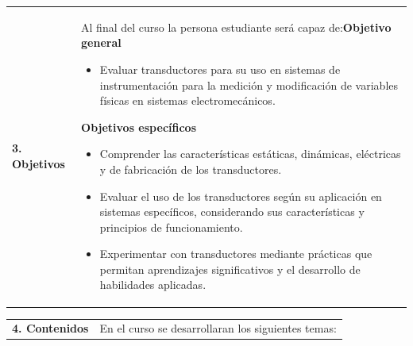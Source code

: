 \documentclass[letterpaper]{article}%
\begin{document}
\begin{tabularx}{\textwidth}{p{3cm}p{13cm}}%
\par\fontsize{12}{14}\selectfont \textbf{\textcolor{parte}{3. Objetivos}}&Al final del curso la persona estudiante será capaz de:\newline\newline \textbf{Objetivo general}\begin{itemize}\item Evaluar transductores para su uso en sistemas de instrumentación para la medición y modificación de variables físicas en sistemas electromecánicos.\end{itemize} \vspace{2mm}\textbf{Objetivos específicos}\begin{itemize}\item Comprender las características estáticas, dinámicas, eléctricas y de fabricación de los transductores.\item Evaluar el uso de los transductores según su aplicación en sistemas específicos, considerando sus características y principios de funcionamiento.\item Experimentar con transductores mediante prácticas que permitan aprendizajes significativos y el desarrollo de habilidades aplicadas.\end{itemize}\\%
\end{tabularx}%
\newpage%
\begin{tabularx}{\textwidth}{p{3cm}p{13cm}}%
\par\fontsize{12}{14}\selectfont \textbf{\textcolor{parte}{4. Contenidos}}&En el curso se desarrollaran los siguientes temas:\\%
\end{tabularx}%
\newline%
\end{document}

